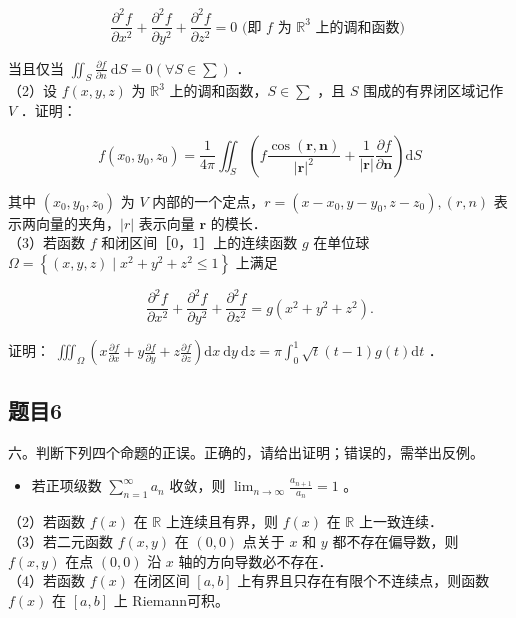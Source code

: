 \documentclass{article}
\begin{document}
\[
\frac{\partial^{2} f}{\partial x^{2}}+\frac{\partial^{2} f}{\partial y^{2}}+\frac{\partial^{2} f}{\partial z^{2}}=0 \text { (即 } f \text { 为 } \mathbb{R}^{3} \text { 上的调和函数) }
\]

当且仅当 \(\iint_{S} \frac{\partial f}{\partial n} \mathrm{~d} S=0\left(\forall S \in \sum\right)\) ．\\
（2）设 \(f(x, y, z)\) 为 \(\mathbb{R}^{3}\) 上的调和函数，\(S \in \sum\) ，且 \(S\) 围成的有界闭区域记作 \(V\) ．证明：

\[
f\left(x_{0}, y_{0}, z_{0}\right)=\frac{1}{4 \pi} \iint_{S}\left(f \frac{\cos (\mathbf{r}, \mathbf{n})}{|\mathbf{r}|^{2}}+\frac{1}{|\mathbf{r}|} \frac{\partial f}{\partial \mathbf{n}}\right) \mathrm{d} S
\]

其中 \(\left(x_{0}, y_{0}, z_{0}\right)\) 为 \(V\) 内部的一个定点，\(r=\left(x-x_{0}, y-y_{0}, z-z_{0}\right),(r, n)\) 表示两向量的夹角，\(|r|\) 表示向量 \(\mathbf{r}\) 的模长．\\
（3）若函数 \(f\) 和闭区间［0，1］上的连续函数 \(g\) 在单位球 \(\Omega=\left\{(x, y, z) \mid x^{2}+y^{2}+z^{2} \leq 1\right\}\) 上满足

\[
\frac{\partial^{2} f}{\partial x^{2}}+\frac{\partial^{2} f}{\partial y^{2}}+\frac{\partial^{2} f}{\partial z^{2}}=g\left(x^{2}+y^{2}+z^{2}\right) .
\]

证明： \(\iiint_{\Omega}\left(x \frac{\partial f}{\partial x}+y \frac{\partial f}{\partial y}+z \frac{\partial f}{\partial z}\right) \mathrm{d} x \mathrm{~d} y \mathrm{~d} z=\pi \int_{0}^{1} \sqrt{t}(t-1) g(t) \mathrm{d} t\) ．

\subsection{题目6}
六。判断下列四个命题的正误。正确的，请给出证明；错误的，需举出反例。

\begin{itemize}
  \item[（1）] 若正项级数 \(\sum_{n=1}^{\infty} a_{n}\) 收敛，则 \(\lim _{n \rightarrow \infty} \frac{a_{n+1}}{a_{n}}=1\) 。
\end{itemize}

（2）若函数 \(f(x)\) 在 \(\mathbb{R}\) 上连续且有界，则 \(f(x)\) 在 \(\mathbb{R}\) 上一致连续．\\
（3）若二元函数 \(f(x, y)\) 在 \((0,0)\) 点关于 \(x\) 和 \(y\) 都不存在偏导数，则 \(f(x, y)\) 在点 \((0,0)\) 沿 \(x\) 轴的方向导数必不存在．\\
（4）若函数 \(f(x)\) 在闭区间 \([a, b]\) 上有界且只存在有限个不连续点，则函数 \(f(x)\) 在 \([a, b]\) 上 Riemann可积。
\end{document}
